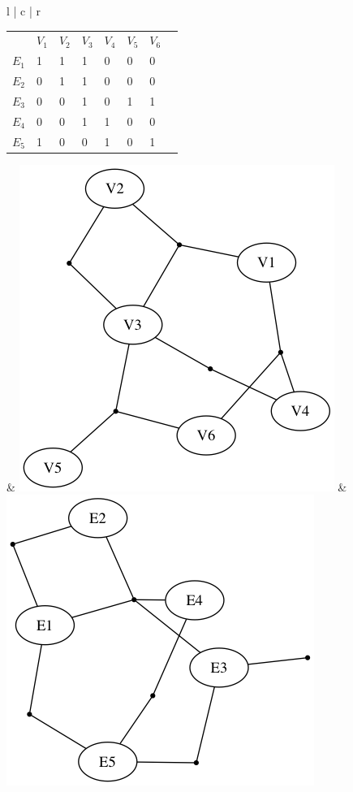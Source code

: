 \documentclass[12pt]{article}
\begin{document}
\begin{center}
\begin{tabular}{l | c | r}

\begin{tabular}{l l l l l l l l}
			 & $V_1$ & $V_2$ & $V_3$ & $V_4$ & $V_5$ & $V_6$ \\
$E_1$  &     1 		& 1          & 1 			& 0 			& 0 			& 0 		 \\
$E_2$  &     0 		& 1          & 1 			& 0 			& 0 			& 0 		 \\
$E_3$  &     0 		& 0          & 1 			& 0 			& 1 			& 1 		 \\
$E_4$  &     0 		& 0          & 1 			& 1			& 0 			& 0 		 \\
$E_5$  &     1 		& 0          & 0 			& 1			& 0 			& 1 		 \\
\end{tabular}

& \includegraphics[scale=.20]{vertex_graph} & \includegraphics[scale=.20]{edge_graph}\
\end{tabular}
\end{center}
\end{document}
